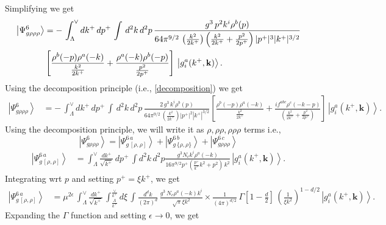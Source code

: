 \documentclass[10pt]{article}
\numberwithin{equation}{section}
\begin{document}
Simplifying we get
\begin{align}
    \left|\Psi_{g\rho\rho\rho}^{6}\right\rangle & = -\, \int_{\Lambda}^{\vee} dk^{+}\, dp^{+}\, \int\, d^{2}k\, d^{2}p\, \frac{g^{3}\, p^{2}k^{i}\rho^{b}(p)}{64\pi^{9/2}\,\left(\frac{k^{2}}{2k^{+}}\right)\left(\frac{k^{2}}{2k^{+}}+\frac{p^{2}}{2p^{+}}\right)|p^{+}|^{3} |k^{+}|^{3/2}}\notag \\ & \left[\frac{\rho^{b}(-p)\rho^{a}(-k)}{\frac{k^{2}}{2k^{+}}} + \frac{\rho^{a}(-k)\rho^{b}(-p)}{\frac{p^{2}}{2p^{+}}}\right]\, \left|g_{i}^{a}(k^{+},\mathbf{k})\right\rangle.
\end{align}
Using the decomposition principle (i.e., \eqref{decomposition}) we get
\begin{align}
    \left|\Psi_{g\rho\rho\rho}^{6}\right\rangle & = -\, \int_{\Lambda}^{\vee} dk^{+}\, dp^{+}\, \int\, d^{2}k\, d^{2}p\, \frac{2\,g^{3}\, k^{i}\rho^{b}(p)}{64\pi^{9/2}\,\left(\frac{k^{2}}{2k^{+}}\right)|p^{+}|^{2} |k^{+}|^{3/2}} \left[\frac{\rho^{b}(-p)\rho^{a}(-k)}{\frac{k^{2}}{2k^{+}}} + \frac{if^{abc}\rho^{c}(-k-p)}{{\left(\frac{k^{2}}{2k^{+}}+\frac{p^{2}}{2p^{+}}\right)}}\right]\, \left|g_{i}^{a}(k^{+},\mathbf{k})\right\rangle.
\end{align}
Using the decomposition principle, we will write it as $\rho, \rho\rho, \rho\rho\rho$ terms i.e.,
$$ \left|\Psi_{g\rho\rho\rho}^{6}\right\rangle = \left|\Psi_{g\,[\rho,\rho]}^{6\, a}\right\rangle + \left|\Psi_{g\,\{\rho,\rho\}}^{6\, b}\right\rangle +  \left|\Psi_{g\rho\rho\rho}^{6\, c}\right\rangle   $$
\begin{align}
\left|\Psi_{g\,[\rho,\rho]}^{6\, a}\right\rangle & = \int_{\Lambda}^{\vee} \frac{dk^{+}}{\sqrt{k^{+}}}\, dp^{+}\, \int d^{2}k \, d^{2}p \frac{g^{3}N_{c}k^{i}\rho^{a}(-k)}{16\pi^{9/2}p^{+}\left(\frac{p^{+}}{k^{+}}k^{2}+p^{2}\right)\,k^{2}}\, \left|g_{i}^{a}(k^{+},\mathbf{k})\right\rangle.
\end{align}
Integrating wrt $p$ and setting $p^{+} = \xi k^{+}$, we get
\begin{align}
    \left|\Psi_{g\,[\rho,\rho]}^{6\, a}\right\rangle & = \mu^{2\epsilon}\,\int_{\Lambda}^{\vee} \frac{dk^{+}}{\sqrt{k^{+}}}\,\int_{\frac{\Lambda}{k^{+}}}^{\frac{\vee}{k^{+}}} d\xi\, \int \frac{d^{d}k}{(2\pi)^{d}} \, \frac{g^{3}\,N_{c}\rho^{a}(-k)k^{i}}{\sqrt{\pi}\xi k^{2}} \times \frac{1}{(4\pi)^{d/2}}\,\Gamma\left[1-\frac{d}{2}\right]\, \left(\frac{1}{\xi k^{2}}\right)^{1-d/2}\, \left|g_{i}^{a}(k^{+},\mathbf{k})\right\rangle.
\end{align}
Expanding the $\Gamma$ function and setting $\epsilon \rightarrow 0$, we get
\end{document}
